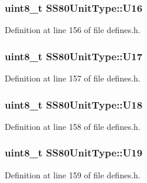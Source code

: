 \subsubsection[{\texorpdfstring{U16}{U16}}]{\setlength{\rightskip}{0pt plus 5cm}uint8\+\_\+t S\+S80\+Unit\+Type\+::\+U16}\hypertarget{structSS80UnitType_a5087f957d0901655950d803a5a644000}{}\label{structSS80UnitType_a5087f957d0901655950d803a5a644000}


Definition at line 156 of file defines.\+h.

\subsubsection[{\texorpdfstring{U17}{U17}}]{\setlength{\rightskip}{0pt plus 5cm}uint8\+\_\+t S\+S80\+Unit\+Type\+::\+U17}\hypertarget{structSS80UnitType_aaf021fbac23492c976d5982acafbc221}{}\label{structSS80UnitType_aaf021fbac23492c976d5982acafbc221}


Definition at line 157 of file defines.\+h.

\subsubsection[{\texorpdfstring{U18}{U18}}]{\setlength{\rightskip}{0pt plus 5cm}uint8\+\_\+t S\+S80\+Unit\+Type\+::\+U18}\hypertarget{structSS80UnitType_ac3edc72ab1fe21eacc43fc09152d5910}{}\label{structSS80UnitType_ac3edc72ab1fe21eacc43fc09152d5910}


Definition at line 158 of file defines.\+h.

\subsubsection[{\texorpdfstring{U19}{U19}}]{\setlength{\rightskip}{0pt plus 5cm}uint8\+\_\+t S\+S80\+Unit\+Type\+::\+U19}\hypertarget{structSS80UnitType_a60163b28ab07a19d2cdd464d5298b425}{}\label{structSS80UnitType_a60163b28ab07a19d2cdd464d5298b425}


Definition at line 159 of file defines.\+h.

